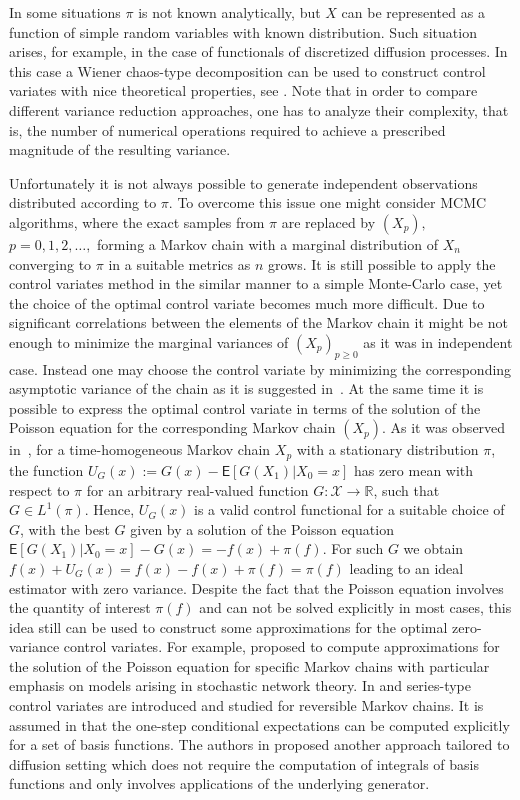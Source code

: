 \documentclass[bj]{imsart}
\def\PE{\mathsf{E}}
\def\rset{\mathbb{R}}
\def\rset{\mathbb{R}}
\begin{document}
In some situations \(\pi\) is not known analytically, but \(X\) can be represented as a function of  simple random variables with known distribution.
Such  situation arises, for example, in the case of functionals of  discretized diffusion processes. In this case a Wiener chaos-type decomposition can be used to construct control variates with nice theoretical properties, see \cite{belomestny2018stratified}.
Note that in order to compare different  variance reduction approaches, one has to analyze their complexity, that is, the number of numerical operations required to achieve a prescribed magnitude of the resulting variance.
\par
Unfortunately it is not always possible to generate independent observations distributed according to $\pi$. To overcome this issue one might consider MCMC algorithms, where the exact samples from $\pi$ are replaced by \((X_p),\) \(p=0,1,2,\ldots,\) forming a Markov chain with a marginal distribution of $X_n$ converging to $\pi$ in a suitable metrics as $n$ grows. It is still possible to apply the control variates method in the similar manner to a simple Monte-Carlo case, yet the choice of the optimal control variate becomes much more difficult. Due to significant correlations between the elements of the Markov chain it might be not enough to minimize the marginal variances of \((X_p)_{p \geq 0}\) as it was in independent case. Instead one may choose the control variate by minimizing the corresponding asymptotic variance of the chain as it is suggested in~\cite{belomestny2019esvm}. At the same time it is possible to express the optimal control variate in terms of the solution of the Poisson equation for the corresponding Markov chain \((X_p)\). As it was observed in~\cite{henderson1997variance,henderson2004}, for a time-homogeneous Markov chain \(X_p\) with a stationary distribution \(\pi\), the function $U_{G}(x) := G(x)-\PE[G(X_{1})|X_0 = x]$ has zero mean with respect to $\pi$ for an arbitrary real-valued function \(G: \mathcal{X} \to \rset\), such that \(G  \in L^1(\pi)\). Hence, $U_{G}(x)$ is a valid control functional for a suitable choice of $G$, with the best $G$ given by a solution of the Poisson equation \(\PE [G(X_{1})|X_0 = x]-G(x)=-f(x)+\pi(f)\). For such $G$ we obtain $f(x) + U_G(x) = f(x) - f(x) + \pi(f) = \pi(f)$ leading to an ideal estimator with zero variance. Despite the fact that the Poisson equation involves the quantity of interest \(\pi(f)\)  and can not be  solved explicitly in most cases, this idea still can be used to construct some  approximations for the optimal zero-variance control variates. For example,  \cite{henderson1997variance} proposed to compute approximations for the solution of the Poisson equation for specific Markov chains with particular emphasis on models arising in stochastic network theory. In \cite{dellaportas2012control} and \cite{brosse2018diffusion}  series-type control variates are introduced and studied for reversible Markov chains. It is assumed in \cite{dellaportas2012control}  that the one-step conditional expectations  can be computed explicitly  for a set of basis functions. The authors in \cite{brosse2018diffusion} proposed another approach tailored to diffusion setting which does not require the computation of integrals of basis functions and only involves  applications of the underlying generator.
\end{document}
